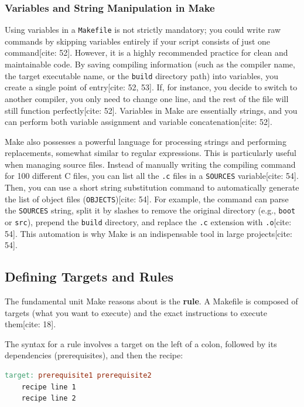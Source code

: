 \subsubsection{Variables and String Manipulation in Make}
Using variables in a \texttt{Makefile} is not strictly mandatory; you could write raw commands by skipping variables entirely if your script consists of just one command[cite: 52]. However, it is a highly recommended practice for clean and maintainable code. By saving compiling information (such as the compiler name, the target executable name, or the \texttt{build} directory path) into variables, you create a single point of entry[cite: 52, 53]. If, for instance, you decide to switch to another compiler, you only need to change one line, and the rest of the file will still function perfectly[cite: 52]. Variables in Make are essentially strings, and you can perform both variable assignment and variable concatenation[cite: 52].

Make also possesses a powerful language for processing strings and performing replacements, somewhat similar to regular expressions. This is particularly useful when managing source files. 
Instead of manually writing the compiling command for 100 different C files, you can list all the \texttt{.c} files in a \texttt{SOURCES} variable[cite: 54]. Then, you can use a short string substitution command to automatically generate the list of object files (\texttt{OBJECTS})[cite: 54]. For example, the command can parse the \texttt{SOURCES} string, split it by slashes to remove the original directory (e.g., \texttt{boot} or \texttt{src}), prepend the \texttt{build} directory, and replace the \texttt{.c} extension with \texttt{.o}[cite: 54]. This automation is why Make is an indispensable tool in large projects[cite: 54].

\subsection{Defining Targets and Rules}
The fundamental unit Make reasons about is the \textbf{rule}. A Makefile is composed of targets (what you want to execute) and the exact instructions to execute them[cite: 18]. 

The syntax for a rule involves a target on the left of a colon, followed by its dependencies (prerequisites), and then the recipe:
\begin{lstlisting}[language=make]
target: prerequisite1 prerequisite2
    recipe line 1
    recipe line 2
\end{lstlisting}

